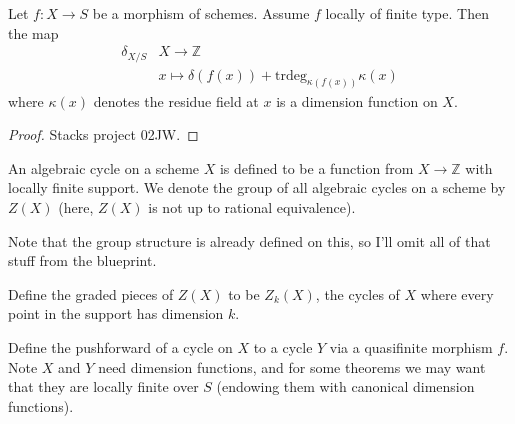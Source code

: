 \begin{theorem}
  \label{02JW}
  Let $f:X \rightarrow S$ be a morphism of schemes.
  Assume $f$ locally of finite type. Then the map
  \[
  \begin{split}
  \delta_{X / S} &X \rightarrow \mathbb{Z}\\
  &x \mapsto \delta (f (x)) + \text{trdeg}_{\kappa(f(x))} \kappa (x)
  \end{split}
  \]
  where $\kappa(x)$ denotes the residue field at $x$ is a dimension function on $X$. 

\end{theorem}
\begin{proof}
  Stacks project 02JW.
\end{proof}


\begin{definition}
  \label{def:algcycle}
  \leanok
  An algebraic cycle on a scheme $X$ is defined to be a function from
  $X \rightarrow \mathbb{Z}$ with locally finite support. We denote the group of all
  algebraic cycles on a scheme by $Z(X)$ (here, $Z(X)$ is not up to rational equivalence).

  Note that the group structure is already defined on this, so I'll omit all of that stuff
  from the blueprint.
\end{definition}

\begin{definition}
  \label{def:algcycleofdim}
  Define the graded pieces of $Z(X)$ to be $Z_k(X)$, the cycles of $X$ where every point
  in the support has dimension $k$.
\end{definition}

\begin{definition}
  \label{def:pushcycle}
  \leanok
  Define the pushforward of a cycle on $X$ to a cycle $Y$ via a quasifinite morphism $f$. 
  Note $X$ and $Y$ need dimension functions, and for some theorems we may want that they
  are locally finite over $S$ (endowing them with canonical dimension functions).

\end{definition}

\begin{theorem}
  \label{thm:pushfunc}
\end{theorem}

